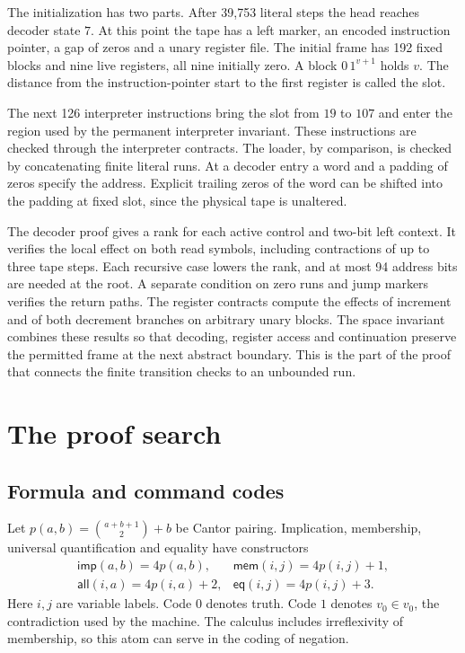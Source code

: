 \documentclass[11pt,letterpaper]{article}
\theoremstyle{definition}
\begin{document}
The initialization has two parts. After 39,753 literal steps the
head reaches decoder state $7$. At this point the tape has a left
marker, an encoded instruction pointer, a gap of zeros and a unary
register file. The initial frame has 192 fixed blocks and nine live
registers, all nine initially zero. A block $0\,1^{v+1}$ holds $v$.
The distance from the instruction-pointer start to the first
register is called the slot.

The next 126 interpreter instructions bring the slot from $19$ to
$107$ and enter the region used by the permanent interpreter
invariant. These instructions are checked through the interpreter
contracts. The loader, by comparison, is checked by concatenating
finite literal runs. At a decoder entry a word and a padding of zeros
specify the address. Explicit trailing zeros of the word can be shifted
into the padding at fixed slot, since the physical tape is unaltered.

The decoder proof gives a rank for each active control and two-bit
left context. It verifies the local effect on both read symbols,
including contractions of up to three tape steps. Each recursive
case lowers the rank, and at most 94 address bits are needed at
the root. A separate condition on zero runs and jump markers verifies
the return paths. The register contracts compute the effects of
increment and of both decrement branches on arbitrary unary blocks.
The space invariant combines these results so that decoding, register
access and continuation preserve the permitted frame at the next
abstract boundary. This is the part of the proof that connects the
finite transition checks to an unbounded run.

\section{The proof search}\label{sec:search}

\subsection{Formula and command codes}

Let $p(a,b)=\binom{a+b+1}{2}+b$ be Cantor pairing. Implication,
membership, universal quantification and equality have constructors
\[
\begin{array}{ll}
  \mathsf{imp}(a,b)=4p(a,b), & \mathsf{mem}(i,j)=4p(i,j)+1,\\
  \mathsf{all}(i,a)=4p(i,a)+2, & \mathsf{eq}(i,j)=4p(i,j)+3.
\end{array}
\]
Here $i,j$ are variable labels. Code $0$ denotes truth. Code $1$
denotes $v_0\in v_0$, the contradiction used by the machine. The
calculus includes irreflexivity of membership, so this atom can
serve in the coding of negation.
\end{document}
